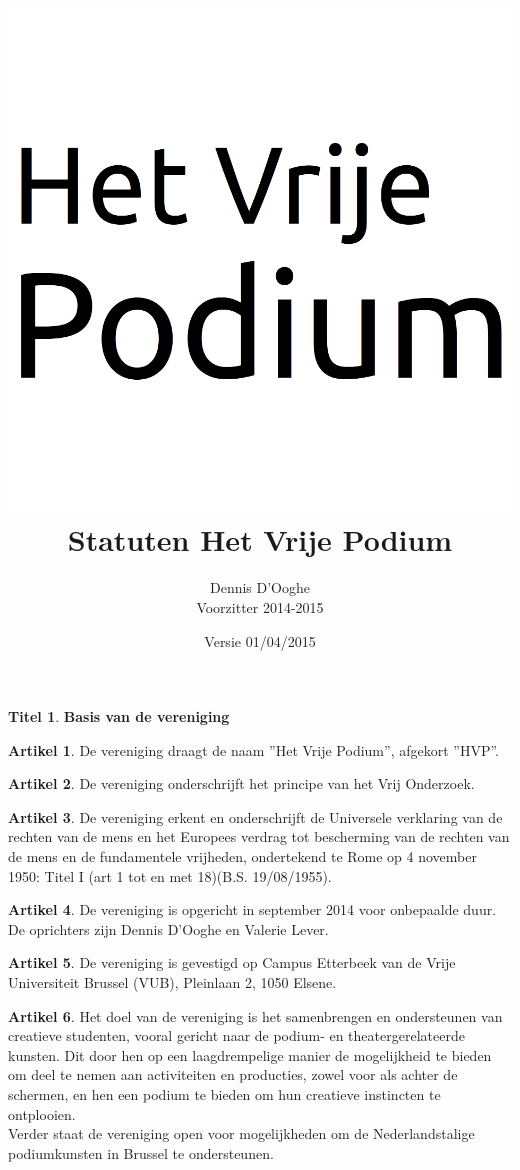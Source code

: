 \documentclass[a4paper,10pt]{article}
\title{\vspace{-2.0cm}\includegraphics[scale=0.3]{img/logo.png}\\
  \vspace{1cm}Statuten Het Vrije Podium}
\author{Dennis D'Ooghe\\Voorzitter 2014-2015}
\date{Versie 01/04/2015} %
\theoremstyle{definition}
\newtheorem{titel}{\newline\Large Titel}
\newtheorem{artikelbase}{\large Artikel}
\newenvironment{artikel}
  {\begin{artikelbase}}
  {\smallskip
   \end{artikelbase}}
\newcommand{\ttext}[1]{\Large \textbf{#1} \normalsize}
\newcommand{\ttextcr}{\hfill\newline}
\begin{document}
\maketitle

\begin{versionhistory}
\end{versionhistory}

\newpage


\begin{titel}\ttext{Basis van de vereniging}

  \begin{artikel}\ttextcr
    De vereniging draagt de naam ''Het Vrije Podium'', afgekort ''HVP''.
  \end{artikel}

  \begin{artikel}\ttextcr
    De vereniging onderschrijft het principe van het Vrij Onderzoek.
  \end{artikel}

  \begin{artikel}\ttextcr
    De vereniging erkent en onderschrijft de Universele verklaring van de rechten van de mens en het Europees verdrag tot bescherming van de rechten van de mens en de fundamentele vrijheden, ondertekend te Rome op 4 november 1950: Titel I (art 1 tot en met 18)(B.S. 19/08/1955).
  \end{artikel}

  \begin{artikel}\label{kring-oprichting}\ttextcr
    De vereniging is opgericht in september 2014 voor onbepaalde duur.
    De oprichters zijn Dennis D'Ooghe en Valerie Lever.
  \end{artikel}

  \begin{artikel}\ttextcr
    De vereniging is gevestigd op Campus Etterbeek van de Vrije Universiteit Brussel (VUB), Pleinlaan 2, 1050 Elsene.
  \end{artikel}

  \begin{artikel}\ttextcr
    Het doel van de vereniging is het samenbrengen en ondersteunen van creatieve studenten, vooral gericht naar de podium- en theatergerelateerde kunsten.
    Dit door hen op een laagdrempelige manier de mogelijkheid te bieden om deel te nemen aan activiteiten en producties, zowel voor als achter de schermen, en hen een podium te bieden om hun creatieve instincten te ontplooien.\\
    Verder staat de vereniging open voor mogelijkheden om de Nederlandstalige podiumkunsten in Brussel te ondersteunen.
  \end{artikel}


\end{titel}
\end{document}
